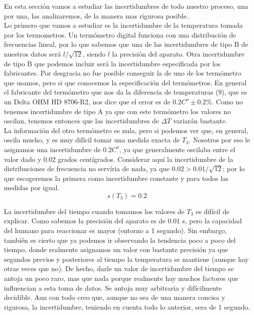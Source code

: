 \documentclass[12pt,a4paper]{article}
\begin{document}
En esta sección vamos a estudiar las incertidumbres de todo nuestro proceso, una por una, las analizaremos, de la manera mas rigurosa posible. \\


Lo primero que vamos a estudiar es la incertidumbre de la temperatura tomada por los termometros. Un termómetro digital funciona con una distribución de frecuencias lineal, por lo que sabemos que una de las incertidumbres de tipo B de nuestros datos será $l/\sqrt{12}$, siendo $l$ la precisión del aparato. Otra incertidumbre de tipo B que podemos incluir será la incertidumbre especificada por los fabricantes. Por desgracia no fue posible conseguir la de uno de los termómetro que usamos, pero si que conocemos la especificación del termómetros. En general el fabricante del termómetro que nos da la diferencia de temperaturas (9), que es un Delta OHM HD 8706-R2, nos dice que el error es de $0.2C^o \pm 0.2\%$. Como no tenemos incertidumbre de tipo A ya que con este termómetro los valores no oscilan, tenemos entonces que las incertidumbres de $\Delta T$ variarán bastante. \\

La información del otro termómetro es nula, pero si podemos ver que, en general, oscila mucho, y es muy difícil tomar una medida exacta de $T_3$. Nosotros por eso le asignamos una incertidumbre de $0.2 C^o$, ya que generalmente oscilaba entre el valor dado y 0.02 grados centígrados. Considerar aquí la incertidumbre de la distribuciones de frecuencia no servíria de nada, ya que $0.02 >  0.01/\sqrt{12}$; por lo que escogeremos la primera como incertidumbre constante y para todos las medidas por igual. \\

\begin{equation}
s(T_3) = 0.2
\end{equation}

La incertidumbre del tiempo cuando tomamos los valores de $T_3$ es difícil de explicar. Como sabemos la precisión del aparato es de 0.01 s, pero la capacidad del humano para reaccionar es mayor (entorno a 1 segundo). Sin embargo, también es cierto que ya podemos ir observando la tendencia poco a poco del tiempo, donde realmente asignamos un valor con bastante precisión ya que segundos previos y posteriores al tiempo la temperatura se mantiene (aunque hay otras veces que no). De hecho, darle un valor de incertidumbre del tiempo se antoja un poco raro, mas que nada porque realmente hay muchos factores que influencian a esta toma de datos. Se antoja muy arbitraria y difícilmente decidible. Aun con todo creo que, aunque no sea de una manera concisa y rigurosa, la incertidumbre, teniendo en cuenta todo lo anterior, sera de 1 segundo. 
\end{document}
